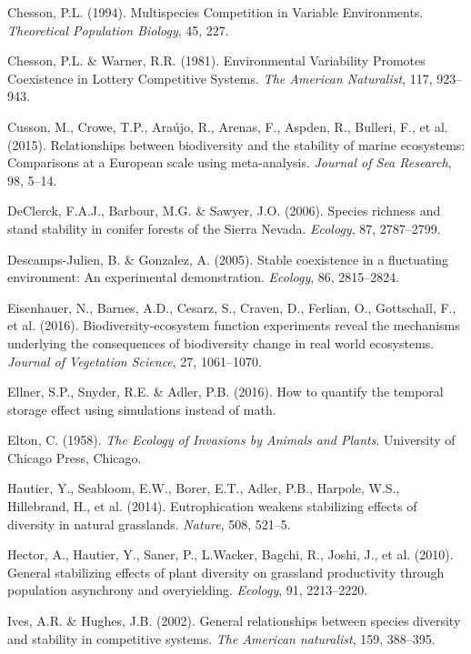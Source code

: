 \documentclass[12pt,]{article}
\begin{document}
\hypertarget{ref-Chesson1994}{}
Chesson, P.L. (1994). Multispecies Competition in Variable Environments.
\emph{Theoretical Population Biology}, 45, 227.

\hypertarget{ref-Chesson1981a}{}
Chesson, P.L. \& Warner, R.R. (1981). Environmental Variability Promotes
Coexistence in Lottery Competitive Systems. \emph{The American
Naturalist}, 117, 923--943.

\hypertarget{ref-Cusson2015}{}
Cusson, M., Crowe, T.P., Araújo, R., Arenas, F., Aspden, R., Bulleri,
F., et al. (2015). Relationships between biodiversity and the stability
of marine ecosystems: Comparisons at a European scale using
meta-analysis. \emph{Journal of Sea Research}, 98, 5--14.

\hypertarget{ref-DeClerck2006}{}
DeClerck, F.A.J., Barbour, M.G. \& Sawyer, J.O. (2006). Species richness
and stand stability in conifer forests of the Sierra Nevada.
\emph{Ecology}, 87, 2787--2799.

\hypertarget{ref-Descamps-Julien2005}{}
Descamps-Julien, B. \& Gonzalez, A. (2005). Stable coexistence in a
fluctuating environment: An experimental demonstration. \emph{Ecology},
86, 2815--2824.

\hypertarget{ref-Eisenhauer2016}{}
Eisenhauer, N., Barnes, A.D., Cesarz, S., Craven, D., Ferlian, O.,
Gottschall, F., et al. (2016). Biodiversity-ecosystem function
experiments reveal the mechanisms underlying the consequences of
biodiversity change in real world ecosystems. \emph{Journal of
Vegetation Science}, 27, 1061--1070.

\hypertarget{ref-Ellner2016}{}
Ellner, S.P., Snyder, R.E. \& Adler, P.B. (2016). How to quantify the
temporal storage effect using simulations instead of math.

\hypertarget{ref-Elton1958}{}
Elton, C. (1958). \emph{The Ecology of Invasions by Animals and Plants}.
University of Chicago Press, Chicago.

\hypertarget{ref-Hautier2014}{}
Hautier, Y., Seabloom, E.W., Borer, E.T., Adler, P.B., Harpole, W.S.,
Hillebrand, H., et al. (2014). Eutrophication weakens stabilizing
effects of diversity in natural grasslands. \emph{Nature}, 508, 521--5.

\hypertarget{ref-Hector2010}{}
Hector, A., Hautier, Y., Saner, P., L.Wacker, Bagchi, R., Joshi, J., et
al. (2010). General stabilizing effects of plant diversity on grassland
productivity through population asynchrony and overyielding.
\emph{Ecology}, 91, 2213--2220.

\hypertarget{ref-Ives2002b}{}
Ives, A.R. \& Hughes, J.B. (2002). General relationships between species
diversity and stability in competitive systems. \emph{The American
naturalist}, 159, 388--395.
\end{document}
